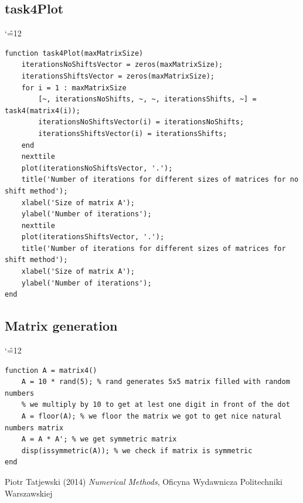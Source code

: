 \documentclass[12pt]{report}
\newenvironment{simplechar}{%
   \catcode`\^=12
}{}
\begin{document}
\newpage
\hypertarget{function4}{\subsection{task4Plot}}
\begin{simplechar}
\begin{lstlisting}
function task4Plot(maxMatrixSize)
    iterationsNoShiftsVector = zeros(maxMatrixSize);
    iterationsShiftsVector = zeros(maxMatrixSize);
    for i = 1 : maxMatrixSize
        [~, iterationsNoShifts, ~, ~, iterationsShifts, ~] = task4(matrix4(i));
        iterationsNoShiftsVector(i) = iterationsNoShifts;
        iterationsShiftsVector(i) = iterationsShifts;
    end
    nexttile
    plot(iterationsNoShiftsVector, '.');
    title('Number of iterations for different sizes of matrices for no shift method');
    xlabel('Size of matrix A');
    ylabel('Number of iterations');
    nexttile
    plot(iterationsShiftsVector, '.');
    title('Number of iterations for different sizes of matrices for shift method');
    xlabel('Size of matrix A');
    ylabel('Number of iterations');
end
\end{lstlisting}
\end{simplechar}

\hypertarget{function4_matrix_generation}{\subsection{Matrix generation}}
\begin{simplechar}
\begin{lstlisting}
function A = matrix4()
    A = 10 * rand(5); % rand generates 5x5 matrix filled with random numbers
    % we multiply by 10 to get at lest one digit in front of the dot
    A = floor(A); % we floor the matrix we got to get nice natural numbers matrix
    A = A * A'; % we get symmetric matrix
    disp(issymmetric(A)); % we check if matrix is symmetric
end
\end{lstlisting}
\end{simplechar}


\begin{thebibliography}{9}
Piotr Tatjewski (2014) \emph{Numerical Methods}, Oficyna Wydawnicza Politechniki Warszawskiej
\end{thebibliography}
\end{document}
